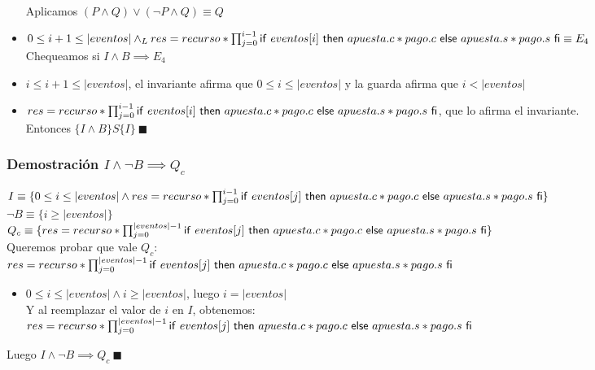 \documentclass[10pt,a4paper]{article}
\begin{document}
\begin{itemize}
	\\ Aplicamos $(P \land Q) \lor (\neg P \land Q) \equiv Q$
	\item  $0 \leq i + 1 \leq |eventos| \land _L res = recurso * \prod_{j = 0}^{i-1}\mathsf{if}\ eventos[i]\ \mathsf{then}\ apuesta.c*pago.c\ \mathsf{else}\ apuesta.s*pago.s\ \mathsf{fi} \equiv E_4$
	\\ Chequeamos si $I \land B \implies E_4$
	\item $i \leq i + 1 \leq |eventos|$, el invariante afirma que $0 \leq i \leq |eventos|$ y la guarda afirma que $i < |eventos|$
	\item $res = recurso * \prod_{j = 0}^{i-1}\mathsf{if}\ eventos[i]\ \mathsf{then}\ apuesta.c*pago.c\ \mathsf{else}\ apuesta.s*pago.s\ \mathsf{fi}$, que lo afirma el invariante. \\ Entonces $\{I\land B\}S\{I\}\ \blacksquare$
\end{itemize}
\subsubsection*{Demostración $I \land \neg B \implies Q_c$}
\noindent $I \equiv \{0 \leq i \leq |eventos| \land res = recurso * \prod_{j = 0}^{i - 1} \mathsf{if}\ eventos[j]\ \mathsf{then}\ apuesta.c *pago.c\ \mathsf{else}\ apuesta.s * pago.s\ \mathsf{fi}\}$ \\
$\neg B \equiv \{i \geq |eventos|\}$ \\
$Q_c \equiv \{res = recurso * \prod_{j = 0}^{|eventos| - 1} \mathsf{if}\ eventos[j]\ \mathsf{then}\ apuesta.c *pago.c\ \mathsf{else}\ apuesta.s * pago.s\ \mathsf{fi}\}$ \\
Queremos probar que vale $Q_c$: \\
$res  = recurso * \prod_{j = 0}^{|eventos| - 1} \mathsf{if}\ eventos[j]\ \mathsf{then}\ apuesta.c *pago.c\ \mathsf{else}\ apuesta.s * pago.s\ \mathsf{fi}$
\begin{itemize}
	\item $0 \leq i \leq |eventos| \land i \geq |eventos|$, luego $i = |eventos| $ \\ Y al reemplazar el valor de $i$ en $I$, obtenemos: \\
	$res = recurso * \prod_{j = 0}^{|eventos| - 1} \mathsf{if}\ eventos[j]\ \mathsf{then}\ apuesta.c *pago.c\ \mathsf{else}\ apuesta.s * pago.s\ \mathsf{fi}$
\end{itemize}
Luego $I \land \neg B \implies Q_c\ \blacksquare$
\end{document}
